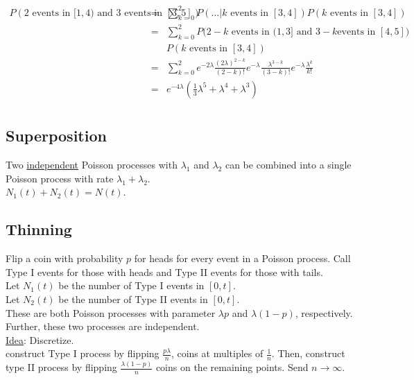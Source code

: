    \begin{eqnarray*}
    P(\text{2 events in $[1, 4)$ and 3 events in $[3,5]$})
      & = & \sum_{k = 0}^2 P( \ldots | \text{$k$ events in $[3, 4]$}) 
        P(\text{$k$ events in $[3, 4]$})\\
      & = & \sum_{k = 0}^{2} P(\text{$2 - k$ events in $(1, 3]$ and $3 - k$
      events in $[4, 5]$)} \\
      & & P(\text{$k$ events in $[3,4]$})\\
      & = & \sum_{k = 0}^2 e^{-2\lambda} \frac{(2\lambda)^{2 - k}}{(2 - k)!}
        e^{-\lambda}\frac{\lambda^{3 - k}}{(3 - k)!} e^{-\lambda}
        \frac{\lambda^k}{k!}\\
      & = & e^{-4\lambda}(\frac{1}{3} \lambda^5 + \lambda^4 + \lambda^3)\\
   \end{eqnarray*}
   \subsection{Superposition}
    Two \underline{independent} Poisson processes with $\lambda_1$ and 
    $\lambda_2$ can be combined into a single Poisson process with rate 
    $\lambda_1 + \lambda_2$.\\
    $N_1(t) + N_2(t) = N(t)$.\\
   \subsection*{Thinning}
    Flip a coin with probability $p$ for heads for every event in a Poisson 
    process. Call Type I events for those with heads and Type II events for 
    those with tails. \\
    Let $N_1(t)$ be the number of Type I events in $[0, t]$.\\
    Let $N_2(t)$ be the number of Type II events in $[0, t]$.\\
    These are both Poisson processes with parameter $\lambda p$ and 
    $\lambda(1-p)$, respectively.\\
    Further, these two processes are independent.\\
    \underline{Idea}: Discretize.\\
      construct Type I process by flipping $\frac{p\lambda}{n}$, coins at 
      multiples of $\frac{1}{n}$. Then, construct type II process by flipping
      $\frac{\lambda(1 - p)}{n}$ coins on the remaining points. Send $n \to
      \infty$.\\

